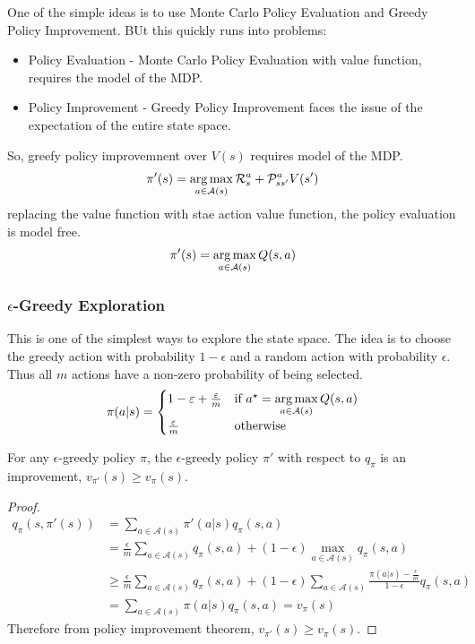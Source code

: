 One of the simple ideas is to use Monte Carlo Policy Evaluation and Greedy Policy Improvement.
BUt this quickly runs into problems:
\begin{itemize}
  \item Policy Evaluation - Monte Carlo Policy Evaluation with value function, requires
  the model of the MDP.
  \item Policy Improvement - Greedy Policy Improvement faces the issue of the
  expectation of the entire state space.
\end{itemize}
So, greefy policy improvemnent over \(V(s)\) requires model of the MDP.
\[
  \pi'(s) = \operatorname*{arg\,max}_{a \in \mathcal{A}(s)} \mathcal{R}^a_s + \mathcal{P} ^a_{ss'} V(s')
\]
replacing the value function with stae action value function, the policy evaluation is model
free.
\[
  \pi'(s) = \operatorname*{arg\,max}_{a \in \mathcal{A}(s)} Q(s,a)
\]

\subsubsection{\(\epsilon\)-Greedy Exploration}
This is one of the simplest ways to explore the state space. The idea is to choose the greedy
action with probability \(1-\epsilon\) and a random action with probability \(\epsilon\). 
Thus all \(m\) actions have a non-zero probability of being selected. 
\[
  \pi(a|s) = \begin{cases}
    1-\varepsilon + \frac{\varepsilon}{m} & \text{if } a^{\star}  = \operatorname*{arg\,max}\limits_
    {a \in \mathcal{A}(s)} Q(s,a) \\
    \frac{\varepsilon}{m} & \text{otherwise}
  \end{cases}
\]


\begin{theorem}
  For any \(\epsilon \)-greedy policy \(\pi\), the \(\epsilon \)-greedy policy \(\pi'\) with
  respect to \(q_\pi \) is an improvement, \(v_{\pi'}(s) \geq v_\pi(s)\).
\end{theorem}
\begin{proof}
  \begin{align*}
    q_\pi(s, \pi'(s)) &= \sum_{a \in \mathcal{A}(s)} \pi'(a|s) q_\pi(s,a) \\
    &= \frac{\epsilon}{m} \sum_{a \in \mathcal{A}(s)} q_\pi(s,a) + (1-\epsilon) \max_{a \in
    \mathcal{A}(s)} q_\pi(s,a) \\
    &\geq \frac{\epsilon}{m} \sum_{a \in \mathcal{A}(s)} q_\pi(s,a) + (1-\epsilon) \sum_{a
    \in \mathcal{A}(s)} \frac{\pi(a|s) - \frac{\epsilon}{m}}{1-\epsilon} q_\pi(s,a) \\
    &= \sum_{a \in \mathcal{A}(s)} \pi(a|s) q_\pi(s,a) = v_\pi(s)
  \end{align*}
  Therefore from policy improvement theorem, \(v_{\pi'}(s) \geq v_\pi(s)\).
\end{proof} 

